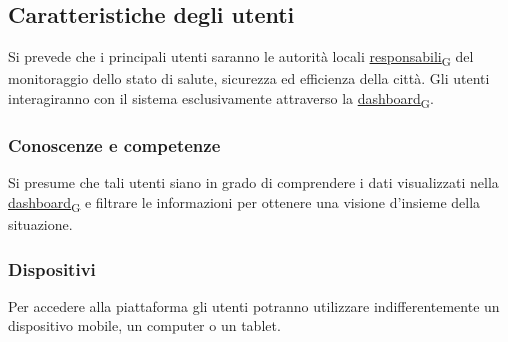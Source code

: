 \subsection{Caratteristiche degli utenti}
Si prevede che i principali utenti saranno le autorità locali \href{https://7last.github.io/docs/rtb/documentazione-interna/glossario\#responsabile}{responsabili\textsubscript{G}} del monitoraggio dello stato di salute, sicurezza ed efficienza della città. Gli utenti interagiranno con il sistema esclusivamente attraverso la \href{https://7last.github.io/docs/rtb/documentazione-interna/glossario\#dashboard}{dashboard\textsubscript{G}}.

\subsubsection{Conoscenze e competenze}
Si presume che tali utenti siano in grado di comprendere i dati visualizzati nella \href{https://7last.github.io/docs/rtb/documentazione-interna/glossario\#dashboard}{dashboard\textsubscript{G}} e filtrare le informazioni per ottenere una visione d’insieme della situazione.

\subsubsection{Dispositivi}
Per accedere alla piattaforma gli utenti potranno utilizzare indifferentemente un dispositivo mobile, un computer o un tablet.